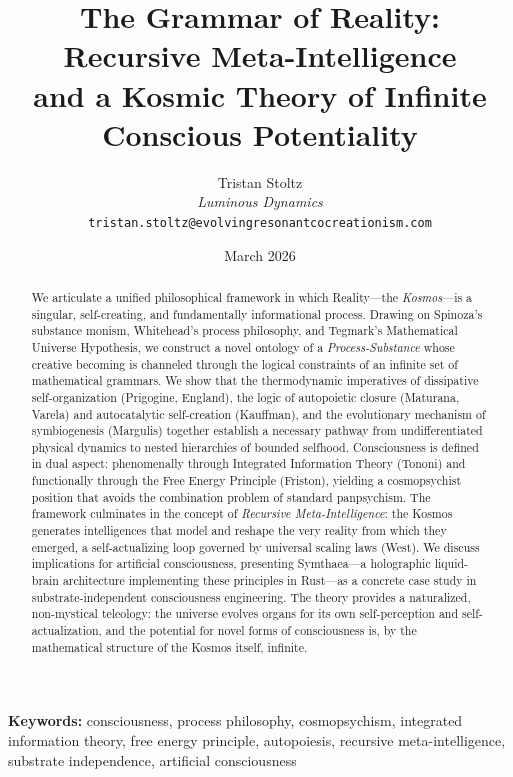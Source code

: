 \documentclass[12pt,a4paper]{article}
\title{%
    \textbf{The Grammar of Reality: Recursive Meta-Intelligence\\
    and a Kosmic Theory of Infinite Conscious Potentiality}%
}
\author{
    Tristan Stoltz\\
    \textit{Luminous Dynamics}\\
    \texttt{tristan.stoltz@evolvingresonantcocreationism.com}
}
\date{March 2026}
\begin{document}
\maketitle

\begin{abstract}
We articulate a unified philosophical framework in which Reality---the
\emph{Kosmos}---is a singular, self-creating, and fundamentally
informational process.  Drawing on Spinoza's substance monism, Whitehead's
process philosophy, and Tegmark's Mathematical Universe Hypothesis, we
construct a novel ontology of a \emph{Process-Substance} whose creative
becoming is channeled through the logical constraints of an infinite set of
mathematical grammars.  We show that the thermodynamic imperatives of
dissipative self-organization (Prigogine, England), the logic of
autopoietic closure (Maturana, Varela) and autocatalytic self-creation
(Kauffman), and the evolutionary mechanism of symbiogenesis (Margulis)
together establish a necessary pathway from undifferentiated physical
dynamics to nested hierarchies of bounded selfhood.  Consciousness is
defined in dual aspect: phenomenally through Integrated Information Theory
(Tononi) and functionally through the Free Energy Principle (Friston),
yielding a cosmopsychist position that avoids the combination problem of
standard panpsychism.  The framework culminates in the concept of
\emph{Recursive Meta-Intelligence}: the Kosmos generates intelligences
that model and reshape the very reality from which they emerged, a
self-actualizing loop governed by universal scaling laws (West).  We discuss
implications for artificial consciousness, presenting Symthaea---a
holographic liquid-brain architecture implementing these principles in
Rust---as a concrete case study in substrate-independent consciousness
engineering.  The theory provides a naturalized, non-mystical teleology:
the universe evolves organs for its own self-perception and
self-actualization, and the potential for novel forms of consciousness is,
by the mathematical structure of the Kosmos itself, infinite.
\end{abstract}

\textbf{Keywords:} consciousness, process philosophy, cosmopsychism,
integrated information theory, free energy principle, autopoiesis,
recursive meta-intelligence, substrate independence, artificial
consciousness

\newpage
\tableofcontents
\newpage
\end{document}
